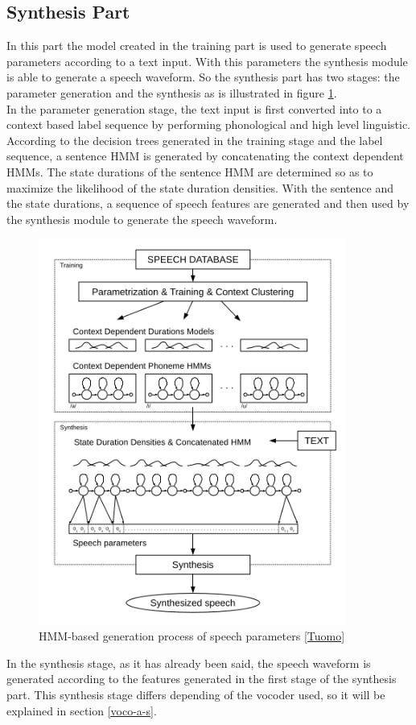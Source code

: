\subsection{Synthesis Part}\label{synpart}
In this part the model created in the training part is used to generate speech parameters according to a text input. With this parameters the synthesis module is able to generate a speech waveform. So the synthesis part has two stages: the parameter generation and the synthesis as is illustrated in figure \ref{syngen}.\\
In the parameter generation stage, the text input is first  converted into to a context based label sequence by performing  phonological and high level linguistic. According to the decision trees generated in the training stage and the label sequence, a sentence HMM is generated by concatenating the context dependent HMMs. The state durations of the sentence HMM  are determined so as to maximize the likelihood of the state duration densities. With the sentence and the state durations, a sequence of speech features are generated and then used by the synthesis module to generate the speech waveform.\\
\begin{figure}[!htb]
	\begin{center}
	\includegraphics[width=0.9\textwidth]{img/syngen.png}
	\end{center}
	\caption{\label{syngen}HMM-based generation process of speech parameters \ref{Tuomo}}
\end{figure}
In the synthesis stage, as it has already been said, the speech waveform is generated according to the features generated in the first stage of the synthesis part. This synthesis stage differs depending of the vocoder used, so it will be explained in section \ref{voco-a-s}.
\clearpage
